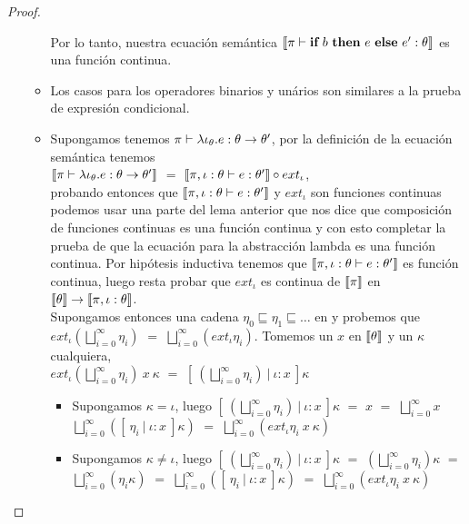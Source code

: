 \begin{proof}
\begin{itemize}
\begin{itemize}
Por lo tanto, nuestra ecuaci\'on sem\'antica $\llbracket \pi \vdash \textbf{if} \ b \ \textbf{then} \ e \ \textbf{else} \ e' : \theta \rrbracket$ es
una funci\'on continua.

\item Los casos para los operadores binarios y un\'arios son similares a la prueba
de expresi\'on condicional.

\item Supongamos tenemos $\pi \vdash \lambda \iota_{\theta} . e : \theta \rightarrow \theta'$, 
por la definici\'on de la ecuaci\'on sem\'antica tenemos \\

$\llbracket \pi \vdash \lambda \iota_{\theta} . e : \theta \rightarrow \theta' \rrbracket$ $=$
$\llbracket \pi,\iota:\theta \vdash e : \theta' \rrbracket \circ ext_\iota$, \\

probando entonces
que $\llbracket \pi,\iota:\theta \vdash e : \theta' \rrbracket$ y $ext_\iota$ son funciones 
continuas podemos usar una parte del lema anterior que nos dice que composici\'on
de funciones continuas es una funci\'on continua y con esto completar la prueba de que
la ecuaci\'on para la abstracci\'on lambda es una funci\'on continua. Por hip\'otesis
inductiva tenemos que $\llbracket \pi,\iota:\theta \vdash e : \theta' \rrbracket$ es funci\'on
continua, luego resta probar que $ext_\iota$ es continua de $\llbracket \pi \rrbracket$ en 
$\llbracket \theta \rrbracket \rightarrow \llbracket \pi,\iota:\theta \rrbracket$.\\

Supongamos entonces una cadena $\eta_0 \sqsubseteq \eta_1 \sqsubseteq \ldots$ en 
y probemos que $ext_\iota (\bigsqcup\limits^{\infty}_{i=0} \eta_i)$ $=$
$\bigsqcup\limits^{\infty}_{i=0} (ext_\iota \eta_i)$. Tomemos un $x$ en $\llbracket \theta \rrbracket$
y un $\kappa$ cualquiera,\\

$ext_\iota (\bigsqcup\limits^{\infty}_{i=0} \eta_i) \ x \ \kappa$ $=$
$[ \ (\bigsqcup\limits^{\infty}_{i=0} \eta_i) \ | \ \iota:x \ ] \kappa$

\begin{itemize}
\item Supongamos $\kappa = \iota$, luego 
$[ \ (\bigsqcup\limits^{\infty}_{i=0} \eta_i) \ | \ \iota:x \ ] \kappa$ $=$
$x$ $=$ $\bigsqcup\limits^{\infty}_{i=0} x$ $\bigsqcup\limits^{\infty}_{i=0} 
([ \ \eta_i \ | \ \iota:x \ ] \kappa)$ $=$ $\bigsqcup\limits^{\infty}_{i=0} (ext_\iota \eta_i \ x \ \kappa)$

\item Supongamos $\kappa \neq \iota$, luego
$[ \ (\bigsqcup\limits^{\infty}_{i=0} \eta_i) \ | \ \iota:x \ ] \kappa$ $=$
$(\bigsqcup\limits^{\infty}_{i=0} \eta_i) \kappa$ $=$
$\bigsqcup\limits^{\infty}_{i=0} (\eta_i \kappa)$ $=$
$\bigsqcup\limits^{\infty}_{i=0} ([ \ \eta_i \ | \ \iota:x \ ] \kappa)$ $=$
$\bigsqcup\limits^{\infty}_{i=0} (ext_\iota \eta_i \ x \ \kappa)$
\end{itemize}


\end{itemize}
\end{itemize}
\end{proof}
